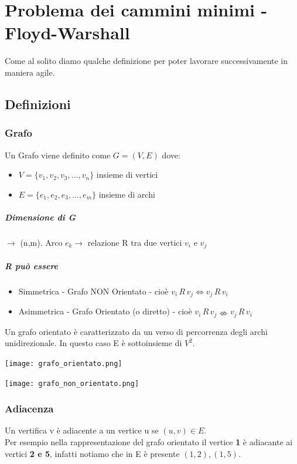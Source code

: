\chapter{Problema dei cammini minimi - Floyd-Warshall}
Come al solito diamo qualche definizione per poter lavorare successivamente in maniera
agile.
\section{Definizioni}
\subsection{Grafo}
Un Grafo viene definito come $G=(V,E)$ dove:
\begin{itemize}
    \item $V = \{v_1,v_2,v_3,...,v_n\}$ insieme di vertici
    \item $E= \{e_1,e_2,e_3,...,e_m\}$ insieme di archi
\end{itemize}
\paragraph*{Dimensione di G} $\rightarrow$ (n,m).
Arco $e_k \rightarrow$ relazione R tra due vertici $v_i$ e $v_j$
\paragraph*{R può essere}
\begin{itemize}
    \item Simmetrica - Grafo NON Orientato - cioè $v_i \, R \, v_j \Leftrightarrow v_j \, R \, v_i$
    \item Asimmetrica - Grafo Orientato (o diretto) - cioè $v_i \, R \, v_j \nLeftrightarrow  v_j \, R \, v_i$
\end{itemize}
Un grafo orientato è caratterizzato da un verso di percorrenza degli archi unidirezionale.
In questo caso E è sottoinsieme di $V^2$.
\begin{center}
    \texttt{[image: grafo\_orientato.png]}
\end{center}
\begin{center}
    \texttt{[image: grafo\_non\_orientato.png]}
\end{center}
\subsection{Adiacenza}
Un vertifica v è adiacente a un vertice u se $(u,v)\in E$.\\
Per esempio nella rappresentazione del grafo orientato il vertice \textbf{1} è adiacante ai
vertici \textbf{2 e 5}, infatti notiamo che in E è presente $(1,2), (1,5)$.
